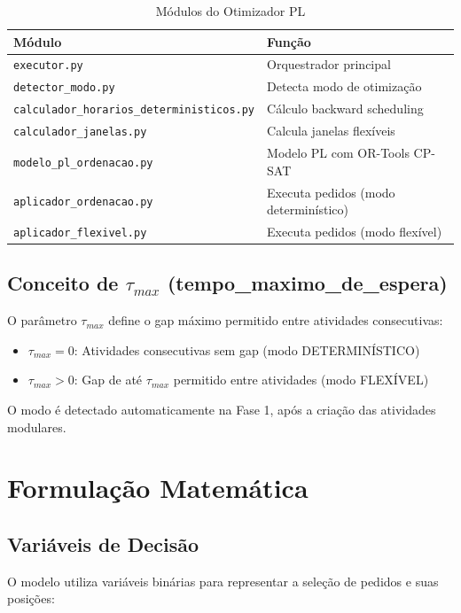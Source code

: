 \documentclass[12pt,a4paper]{article}
\begin{document}
\begin{table}[h]
\centering
\begin{tabular}{ll}
\toprule
\textbf{Módulo} & \textbf{Função} \\
\midrule
\texttt{executor.py} & Orquestrador principal \\
\texttt{detector\_modo.py} & Detecta modo de otimização \\
\texttt{calculador\_horarios\_deterministicos.py} & Cálculo backward scheduling \\
\texttt{calculador\_janelas.py} & Calcula janelas flexíveis \\
\texttt{modelo\_pl\_ordenacao.py} & Modelo PL com OR-Tools CP-SAT \\
\texttt{aplicador\_ordenacao.py} & Executa pedidos (modo determinístico) \\
\texttt{aplicador\_flexivel.py} & Executa pedidos (modo flexível) \\
\bottomrule
\end{tabular}
\caption{Módulos do Otimizador PL}
\end{table}

\subsection{Conceito de $\tau_{max}$ (tempo\_maximo\_de\_espera)}

O parâmetro $\tau_{max}$ define o gap máximo permitido entre atividades consecutivas:

\begin{itemize}
    \item $\tau_{max} = 0$: Atividades consecutivas sem gap (modo DETERMINÍSTICO)
    \item $\tau_{max} > 0$: Gap de até $\tau_{max}$ permitido entre atividades (modo FLEXÍVEL)
\end{itemize}

O modo é detectado automaticamente na Fase 1, após a criação das atividades modulares.

\section{Formulação Matemática}

\subsection{Variáveis de Decisão}

O modelo utiliza variáveis binárias para representar a seleção de pedidos e suas posições:
\end{document}
